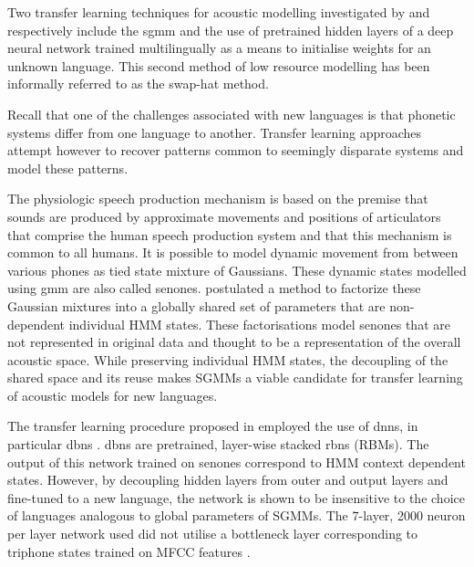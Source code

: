 Two transfer learning techniques for acoustic modelling investigated by \cite{povey2011subspace} and \cite{ghoshal2013multilingual} respectively include the \acrfull{sgmm} and the use of pretrained hidden layers of a deep neural network trained multilingually as a means to initialise weights for an unknown language.  This second method of low resource modelling has been informally referred to as the swap-hat method.

Recall that one of the challenges associated with new languages is that phonetic systems differ from one language to another.  Transfer learning approaches attempt however to recover patterns common to seemingly disparate systems and model these patterns.  

The physiologic speech production mechanism is based on the premise that sounds are produced by approximate movements and positions of articulators that comprise the human speech production system and that this mechanism is common to all humans.  It is possible to model dynamic movement from between various phones as tied state mixture of Gaussians. These dynamic states modelled using \acrfull{gmm} are also called senones. \cite{povey2011subspace} postulated a method to factorize these Gaussian mixtures into a globally shared set of parameters that are non-dependent individual HMM states.  These factorisations model senones that are not represented in original data and thought to be a representation of the overall acoustic space.  While preserving individual HMM states, the decoupling of the shared space and its reuse makes SGMMs a viable candidate for transfer learning of acoustic models for new languages.

The transfer learning procedure proposed in \cite{ghoshal2013multilingual} employed the use of \acrlong{dnns}, in particular \acrfull{dbn}s \citep{bengio2007greedy}.  \acrlong{dbn}s are pretrained, layer-wise  stacked \acrlong{rbn}s (RBMs)\citep{smolensky1986information}.  The output of this network trained on senones correspond to HMM context dependent states.  However, by decoupling hidden layers from outer and output layers and fine-tuned to a new language, the network is shown to be insensitive to the choice of languages analogous to global parameters of SGMMs. The 7-layer, 2000 neuron per layer network used did not utilise a bottleneck layer corresponding to triphone states trained on MFCC features \citep{grezl2008optimizing}.

